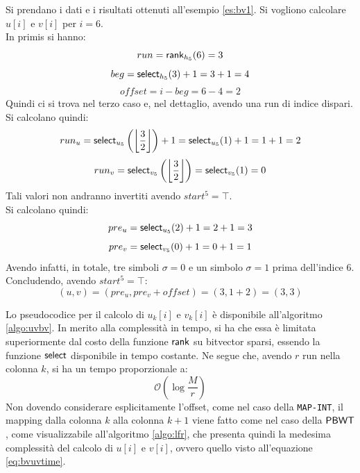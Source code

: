 \begin{esempio}
  Si prendano i dati e i risultati ottenuti all'esempio \ref{es:bv1}. Si
  vogliono calcolare $u[i]$ e $v[i]$ per $i=6$.\\
  In primis si hanno:
  \[run=\mbox{\rm {\sf rank}}_{h_5}(6)=3\]
  \[beg = \mbox{\rm {\sf select}}_{h_5}(3)+1=3+1=4\]
  \[offset = i-beg=6-4=2\]
  Quindi ci si trova nel terzo caso e, nel dettaglio, avendo una run di
  indice dispari. Si calcolano quindi:
  \[run_u=\mbox{\rm {\sf select}}_{u_5}\left(\left\lfloor\frac{3}{2}\right\rfloor\right)+1=
    \mbox{\rm {\sf select}}_{u_5}(1)+1 =1+1=2\] 
  \[run_v=\mbox{\rm {\sf select}}_{v_5}\left(\left\lfloor\frac{3}{2}\right\rfloor\right)=
    \mbox{\rm {\sf select}}_{v_5}(1)=0\] 
  Tali valori non andranno invertiti avendo $start^5=\top$.\\
  Si calcolano quindi:
  \[pre_u=\mbox{\rm {\sf select}}_{u_5}(2)+1=2+1=3\]
  \[pre_v=\mbox{\rm {\sf select}}_{v_5}(0)+1=0+1=1\]
  Avendo infatti, in totale, tre simboli $\sigma=0$ e un simbolo $\sigma=1$
  prima dell'indice 6.\\ 
  Concludendo, avendo $start^5=\top$:
  \[(u,v)=(pre_u, pre_v + offset)=(3,1+2)=(3,3)\]
\end{esempio}
Lo pseudocodice per il calcolo di $u_k[i]$ e $v_k[i]$ è disponibile
all'algoritmo \ref{algo:uvbv}. In merito alla 
complessità in tempo, si ha che essa è
limitata superiormente dal costo della funzione $\mbox{\rm {\sf rank}}$ su
bitvector sparsi, essendo la funzione $\mbox{\rm {\sf select}}$ disponibile in
tempo costante. Ne segue che, avendo $r$ run nella colonna $k$, si ha un tempo
proporzionale a:
\begin{equation}
  \label{eq:bvuvtime}
  \mathcal{O}\left(\log\frac{M}{r}\right)
\end{equation}
Non dovendo considerare esplicitamente l'offset, come nel caso della
\texttt{MAP-INT}, 
il mapping dalla colonna $k$ alla 
colonna $k+1$ viene fatto come nel caso della
$\mbox{\rm {\sf PBWT}}$, come visualizzabile all'algoritmo \ref{algo:lfr}, che presenta
quindi la medesima complessità del calcolo di $u[i]$ e $v[i]$, ovvero quello
visto all'equazione \ref{eq:bvuvtime}.
